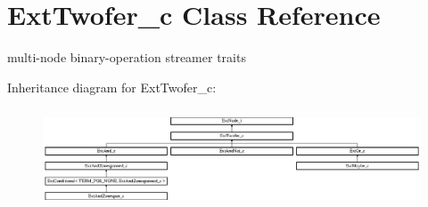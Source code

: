 \hypertarget{classExtTwofer__c}{\section{Ext\-Twofer\-\_\-c Class Reference}
\label{classExtTwofer__c}
}


multi-\/node binary-\/operation streamer traits  


Inheritance diagram for Ext\-Twofer\-\_\-c\-:\begin{figure}[H]
\begin{center}
\leavevmode
\includegraphics[height=2.986667cm]{classExtTwofer__c}
\end{center}
\end{figure}
